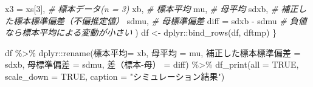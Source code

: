 \documentclass[]{tufte-handout}
\newenvironment{Shaded}{}{}
\newcommand{\AttributeTok}[1]{\textcolor[rgb]{0.49,0.56,0.16}{#1}}
\newcommand{\CommentTok}[1]{\textcolor[rgb]{0.38,0.63,0.69}{\textit{#1}}}
\newcommand{\ConstantTok}[1]{\textcolor[rgb]{0.53,0.00,0.00}{#1}}
\newcommand{\DecValTok}[1]{\textcolor[rgb]{0.25,0.63,0.44}{#1}}
\newcommand{\FunctionTok}[1]{\textcolor[rgb]{0.02,0.16,0.49}{#1}}
\newcommand{\NormalTok}[1]{#1}
\newcommand{\OtherTok}[1]{\textcolor[rgb]{0.00,0.44,0.13}{#1}}
\newcommand{\SpecialCharTok}[1]{\textcolor[rgb]{0.25,0.44,0.63}{#1}}
\newcommand{\StringTok}[1]{\textcolor[rgb]{0.25,0.44,0.63}{#1}}
\begin{document}
\begin{Shaded}
\begin{Highlighting}[numbers=left,,]
                      \AttributeTok{x3 =}\NormalTok{ xs[}\DecValTok{3}\NormalTok{],         }\CommentTok{\# 標本データ(n = 3)}
\NormalTok{                      xb,                 }\CommentTok{\# 標本平均}
\NormalTok{                      mu,                 }\CommentTok{\# 母平均}
\NormalTok{                      sdxb,               }\CommentTok{\# 補正した標本標準偏差（不偏推定値）}
\NormalTok{                      sdmu,               }\CommentTok{\# 母標準偏差}
                      \AttributeTok{diff =}\NormalTok{ sdxb }\SpecialCharTok{{-}}\NormalTok{ sdmu  }\CommentTok{\# 負値なら標本平均による変動が小さい}
\NormalTok{                      )}
\NormalTok{  df }\OtherTok{\textless{}{-}}\NormalTok{ dplyr}\SpecialCharTok{::}\FunctionTok{bind\_rows}\NormalTok{(df, dftmp)}
\NormalTok{\}}

\NormalTok{df }\SpecialCharTok{\%\textgreater{}\%} 
\NormalTok{  dplyr}\SpecialCharTok{::}\FunctionTok{rename}\NormalTok{(}\StringTok{\textasciigrave{}}\AttributeTok{標本平均}\StringTok{\textasciigrave{}}\OtherTok{=}\NormalTok{ xb, }\StringTok{\textasciigrave{}}\AttributeTok{母平均}\StringTok{\textasciigrave{}} \OtherTok{=}\NormalTok{ mu,}
                \StringTok{\textasciigrave{}}\AttributeTok{補正した標本標準偏差}\StringTok{\textasciigrave{}} \OtherTok{=}\NormalTok{ sdxb, }\StringTok{\textasciigrave{}}\AttributeTok{母標準偏差}\StringTok{\textasciigrave{}} \OtherTok{=}\NormalTok{ sdmu,}
                \StringTok{\textasciigrave{}}\AttributeTok{差（標本{-}母）}\StringTok{\textasciigrave{}} \OtherTok{=}\NormalTok{ diff) }\SpecialCharTok{\%\textgreater{}\%} 
  \FunctionTok{df\_print}\NormalTok{(}\AttributeTok{all =} \ConstantTok{TRUE}\NormalTok{, }\AttributeTok{scale\_down =} \ConstantTok{TRUE}\NormalTok{, }\AttributeTok{caption =} \StringTok{"シミュレーション結果"}\NormalTok{)}
\end{Highlighting}
\end{Shaded}
\end{document}
